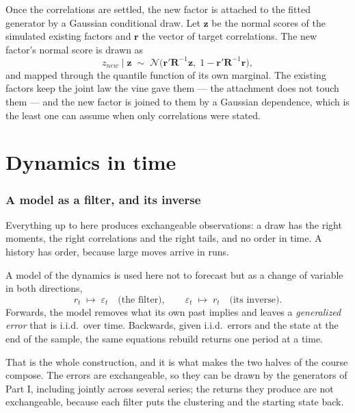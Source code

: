 \documentclass[11pt]{article}
\newcommand{\bR}{\mathbf R}
\newcommand{\br}{\mathbf r}
\begin{document}
Once the correlations are settled, the new factor is attached to the fitted
generator by a Gaussian conditional draw. Let $\mathbf z$ be the normal scores
of the simulated existing factors and $\br$ the vector of target correlations.
The new factor's normal score is drawn as
\begin{equation}\label{eq:attach}
  z_{new} \mid \mathbf z \;\sim\; \mathcal N\!\big(\br'\bR^{-1}\mathbf z,\;
     1 - \br'\bR^{-1}\br\big),
\end{equation}
and mapped through the quantile function of its own marginal. The existing
factors keep the joint law the vine gave them --- the attachment does not touch
them --- and the new factor is joined to them by a Gaussian dependence, which is
the least one can assume when only correlations were stated.


\part{Dynamics in time}

\section{A model as a filter, and its inverse}\label{sec:filter}

Everything up to here produces exchangeable observations: a draw has the right
moments, the right correlations and the right tails, and no order in time. A
history has order, because large moves arrive in runs.

A model of the dynamics is used here not to forecast but as a change of
variable in both directions,
\begin{equation}\label{eq:filter}
  r_t \;\longmapsto\; \varepsilon_t \quad \text{(the filter)}, \qquad
  \varepsilon_t \;\longmapsto\; r_t \quad \text{(its inverse)} .
\end{equation}
Forwards, the model removes what its own past implies and leaves a
\emph{generalized error} that is i.i.d.\ over time. Backwards, given i.i.d.\
errors and the state at the end of the sample, the same equations rebuild
returns one period at a time.

That is the whole construction, and it is what makes the two halves of the
course compose. The errors are exchangeable, so they can be drawn by the
generators of Part I, including jointly across several series; the returns
they produce are not exchangeable, because each filter puts the clustering and
the starting state back.
\end{document}

